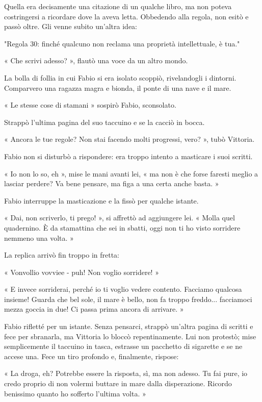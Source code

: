 Quella era decisamente una citazione di un qualche libro, ma non poteva costringersi a ricordare dove la aveva letta. Obbedendo alla regola, non esitò e passò oltre. Gli venne subito un'altra idea:

"Regola 30: finché qualcuno non reclama una proprietà intellettuale, è tua."

« Che scrivi adesso? », flautò una voce da un altro mondo.

La bolla di follia in cui Fabio si era isolato scoppiò, rivelandogli i dintorni. Comparvero una ragazza magra e bionda, il ponte di una nave e il mare.

« Le stesse cose di stamani » sospirò Fabio, sconsolato.

Strappò l'ultima pagina del suo taccuino e se la cacciò in bocca.

« Ancora le tue regole? Non stai facendo molti progressi, vero? », tubò Vittoria.

Fabio non si disturbò a rispondere: era troppo intento a masticare i suoi scritti.

« Io non lo so, eh », mise le mani avanti lei, « ma non è che forse faresti meglio a lasciar perdere? Va bene pensare, ma figa a una certa anche basta. »

Fabio interruppe la masticazione e la fissò per qualche istante.

« Dai, non scriverlo, ti prego! », si affrettò ad aggiungere lei. « Molla quel quadernino. È da stamattina che sei in sbatti, oggi non ti ho visto sorridere nemmeno una volta. »

La replica arrivò fin troppo in fretta:

« Vonvollio vovviee - puh! Non voglio sorridere! »

« E invece sorriderai, perché io ti voglio vedere contento. Facciamo qualcosa insieme! Guarda che bel sole, il mare è bello, non fa troppo freddo... facciamoci mezza goccia in due! Ci passa prima ancora di arrivare. »

Fabio rifletté per un istante. Senza pensarci, strappò un'altra pagina di scritti e fece per sbranarla, ma Vittoria lo bloccò repentinamente. Lui non protestò; mise semplicemente il taccuino in tasca, estrasse un pacchetto di sigarette e se ne accese una. Fece un tiro profondo e, finalmente, rispose:

« La droga, eh? Potrebbe essere la risposta, sì, ma non adesso. Tu fai pure, io credo proprio di non volermi buttare in mare dalla disperazione. Ricordo benissimo quanto ho sofferto l'ultima volta. »

